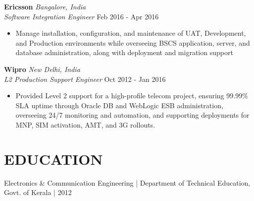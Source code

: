 \documentclass[11pt]{article}
\begin{document}
	\textbf{Ericsson} \hfill \textit{Bangalore, India} \\
	\textit{Software Integration Engineer} \hfill Feb 2016 - Apr 2016
	
	\begin{itemize}
		\item Manage installation, configuration, and maintenance of UAT, Development, and Production environments while overseeing BSCS application, server, and database administration, along with deployment and migration support
	\end{itemize}
	
	\textbf{Wipro} \hfill \textit{New Delhi, India} \\
	\textit{L2 Production Support Engineer} \hfill Oct 2012 - Jan 2016
	
	\begin{itemize}
		\item Provided Level 2 support for a high-profile telecom project, ensuring 99.99\% SLA uptime through Oracle DB and WebLogic ESB administration, overseeing 24/7 monitoring and automation, and supporting deployments for MNP, SIM activation, AMT, and 3G rollouts.
	\end{itemize} \vspace{-1.8em}
	
	\section*{{\fontsize{15}{0}\selectfont E}DUCATION} \vspace{-1em}
	Electronics \& Communication Engineering | Department of Technical Education, Govt. of Kerala | 2012\vspace{-1em}
	
	\vspace{-0.6em}
\end{document}
